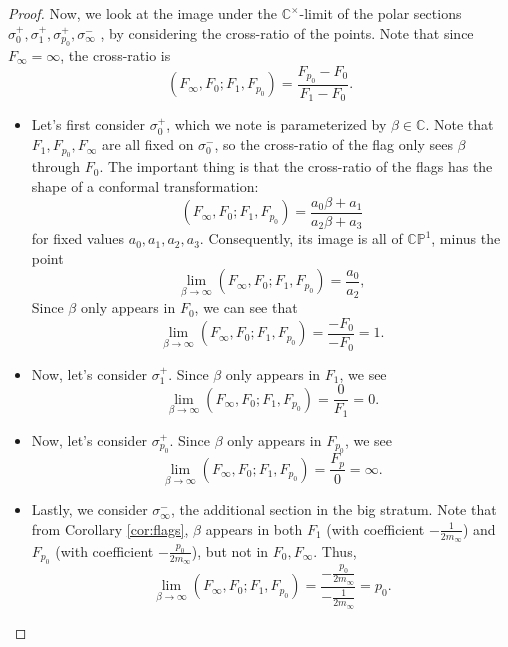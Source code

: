 \documentclass[12pt,letterpaper,reqno]{amsart}
\theoremstyle{remark}
\theoremstyle{definition}
\numberwithin{thm}{section}
\numberwithin{equation}{section}
\numberwithin{figure}{section}
\newcommand{\C}{\ensuremath{\mathbb C}}
\begin{document}
\begin{proof}
Now, we look at the image under the $\C^\times$-limit of the polar sections $\sigma^+_0, \sigma^+_1, \sigma^+_{p_0}, \sigma_\infty^-$ , by considering the cross-ratio of the points.
Note that since $F_\infty=\infty$, the cross-ratio is 
\[ (F_\infty, F_0; F_1, F_{p_0})= \frac{F_{p_0} - F_0}{F_1-F_0}.\]
\begin{itemize}
\item Let's first consider $\sigma^+_0$, which we note is parameterized by $\beta \in \C$. Note that $F_1, F_{p_0}, F_\infty$ are all fixed on $\sigma^-_0$, so the cross-ratio of the flag only sees $\beta$ through $F_0$.
The important thing is that the cross-ratio of the flags has the shape of a conformal transformation:
\begin{equation} (F_\infty, F_0; F_1, F_{p_0}) = \frac{a_0 \beta + a_1}{a_2 \beta + a_3}\label{eq:conformal}\end{equation}
for fixed values $a_0, a_1, a_2, a_3$. 
Consequently, its image is all of $\mathbb{CP}^1$, minus the point 
\[ \lim_{\beta \to \infty} (F_\infty, F_0; F_1, F_{p_0}) = \frac{a_0}{a_2}, \]
Since $\beta$ only appears in $F_0$, we can see that 
\[ \lim_{\beta \to \infty} (F_\infty, F_0; F_1, F_{p_0}) =\frac{-F_0}{-F_0} = 1.\]
\item Now, let's consider $\sigma^+_1$. Since $\beta$ only appears in $F_1$, we see
\[ \lim_{\beta \to \infty} (F_\infty, F_0; F_1, F_{p_0}) =\frac{0}{F_1} = 0.\]
\item Now, let's consider $\sigma^+_{p_0}$. Since $\beta$ only appears in $F_{p_0}$, we see 
\[ \lim_{\beta \to \infty} (F_\infty, F_0; F_1, F_{p_0}) =\frac{F_p}{0}= \infty.\]
\item 
Lastly, we consider $\sigma_\infty^-$, the additional section in the big stratum. Note that from Corollary \ref{cor:flags}, $\beta$ appears in both $F_1$ (with coefficient $-\frac{1}{2m_\infty}$) and $F_{p_0}$ (with coefficient $-\frac{p_0}{2m_\infty}$), but not in $F_0, F_\infty$. Thus, 
\[ \lim_{\beta \to \infty} (F_\infty, F_0; F_1, F_{p_0}) = \frac{-\frac{p_0}{2m_\infty}}{-\frac{1}{2m_\infty}} = p_0. \]
\end{itemize}



\end{proof}
\end{document}
